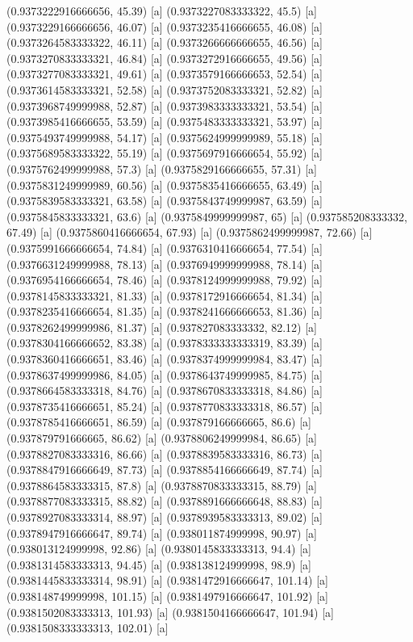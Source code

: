 {{{(0.9373222916666656, 45.39) [a] 
(0.9373227083333322, 45.5) [a] 
(0.9373229166666656, 46.07) [a] 
(0.9373235416666655, 46.08) [a] 
(0.9373264583333322, 46.11) [a] 
(0.9373266666666655, 46.56) [a] 
(0.9373270833333321, 46.84) [a] 
(0.9373272916666655, 49.56) [a] 
(0.9373277083333321, 49.61) [a] 
(0.9373579166666653, 52.54) [a] 
(0.9373614583333321, 52.58) [a] 
(0.9373752083333321, 52.82) [a] 
(0.9373968749999988, 52.87) [a] 
(0.9373983333333321, 53.54) [a] 
(0.9373985416666655, 53.59) [a] 
(0.9375483333333321, 53.97) [a] 
(0.9375493749999988, 54.17) [a] 
(0.9375624999999989, 55.18) [a] 
(0.9375689583333322, 55.19) [a] 
(0.9375697916666654, 55.92) [a] 
(0.9375762499999988, 57.3) [a] 
(0.9375829166666655, 57.31) [a] 
(0.9375831249999989, 60.56) [a] 
(0.9375835416666655, 63.49) [a] 
(0.9375839583333321, 63.58) [a] 
(0.9375843749999987, 63.59) [a] 
(0.9375845833333321, 63.6) [a] 
(0.9375849999999987, 65) [a] 
(0.937585208333332, 67.49) [a] 
(0.9375860416666654, 67.93) [a] 
(0.9375862499999987, 72.66) [a] 
(0.9375991666666654, 74.84) [a] 
(0.9376310416666654, 77.54) [a] 
(0.9376631249999988, 78.13) [a] 
(0.9376949999999988, 78.14) [a] 
(0.9376954166666654, 78.46) [a] 
(0.9378124999999988, 79.92) [a] 
(0.9378145833333321, 81.33) [a] 
(0.9378172916666654, 81.34) [a] 
(0.9378235416666654, 81.35) [a] 
(0.9378241666666653, 81.36) [a] 
(0.9378262499999986, 81.37) [a] 
(0.937827083333332, 82.12) [a] 
(0.9378304166666652, 83.38) [a] 
(0.9378333333333319, 83.39) [a] 
(0.9378360416666651, 83.46) [a] 
(0.9378374999999984, 83.47) [a] 
(0.9378637499999986, 84.05) [a] 
(0.9378643749999985, 84.75) [a] 
(0.9378664583333318, 84.76) [a] 
(0.9378670833333318, 84.86) [a] 
(0.9378735416666651, 85.24) [a] 
(0.9378770833333318, 86.57) [a] 
(0.9378785416666651, 86.59) [a] 
(0.937879166666665, 86.6) [a] 
(0.937879791666665, 86.62) [a] 
(0.9378806249999984, 86.65) [a] 
(0.9378827083333316, 86.66) [a] 
(0.9378839583333316, 86.73) [a] 
(0.9378847916666649, 87.73) [a] 
(0.9378854166666649, 87.74) [a] 
(0.9378864583333315, 87.8) [a] 
(0.9378870833333315, 88.79) [a] 
(0.9378877083333315, 88.82) [a] 
(0.9378891666666648, 88.83) [a] 
(0.9378927083333314, 88.97) [a] 
(0.9378939583333313, 89.02) [a] 
(0.9378947916666647, 89.74) [a] 
(0.938011874999998, 90.97) [a] 
(0.938013124999998, 92.86) [a] 
(0.9380145833333313, 94.4) [a] 
(0.9381314583333313, 94.45) [a] 
(0.938138124999998, 98.9) [a] 
(0.9381445833333314, 98.91) [a] 
(0.9381472916666647, 101.14) [a] 
(0.938148749999998, 101.15) [a] 
(0.9381497916666647, 101.92) [a] 
(0.9381502083333313, 101.93) [a] 
(0.9381504166666647, 101.94) [a] 
(0.9381508333333313, 102.01) [a] 
}}}
